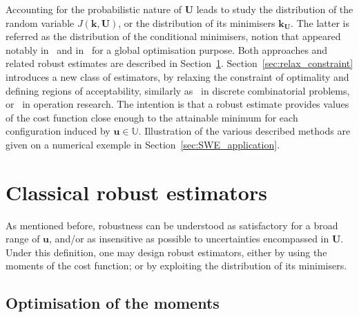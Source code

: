 \documentclass[preprint, 1p]{elsarticle}
\newcommand{\Uspace}{\mathbb{U}}
\begin{document}
Accounting for the probabilistic nature of  $\mathbf{U}$ leads to study the distribution of the random variable $J(\mathbf{k},\mathbf{U})$, or the distribution of its minimisers ${\mathbf{k}}_{\mathbf{U}}$. The latter is referred as 
the distribution of the conditional minimisers, notion that appeared notably in~\cite{villemonteix_informational_2006} and in~\cite{hennig_entropy_2011} for a global optimisation purpose. Both approaches and related robust estimates are described in Section~\ref{robust formulations}. Section~\ref{sec:relax_constraint} introduces a new class of estimators, by relaxing the constraint of optimality and defining regions of acceptability, similarly as~\cite{buhmann_robust_2013} in discrete combinatorial problems, or~\cite{kouvelis_algorithms_1992,snyder_stochastic_2004} in operation research. The intention is that a robust estimate provides values of the cost function close enough to the attainable minimum for each configuration induced by $\mathbf{u}\in\Uspace$. Illustration of the various described methods are given on a numerical exemple in Section~\ref{sec:SWE_application}.



\section{Classical robust estimators}
\label{robust formulations}

As mentioned before, robustness can be understood as satisfactory for a broad range of $\mathbf{u}$, and/or as insensitive as possible to uncertainties encompassed in $\mathbf{U}$. Under this definition, one may design robust estimators, either by using the moments of the cost function; or by exploiting the distribution of its minimisers.
\subsection{Optimisation of the moments}
\end{document}

